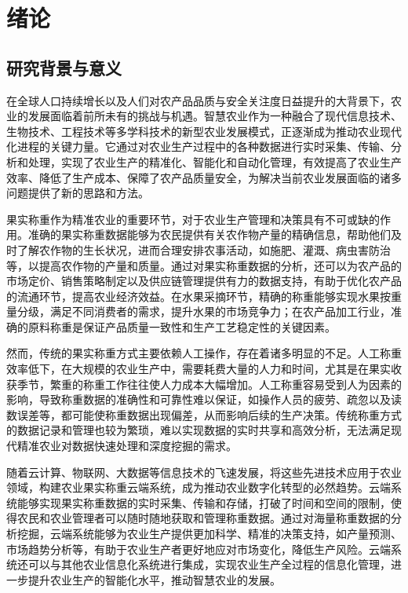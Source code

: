 \documentclass{xduugthesis}
\begin{document}
\chapter{绪论}

\section{研究背景与意义}

在全球人口持续增长以及人们对农产品品质与安全关注度日益提升的大背景下，农业的发展面临着前所未有的挑战与机遇。智慧农业作为一种融合了现代信息技术、生物技术、工程技术等多学科技术的新型农业发展模式\cite{赵春江2021智慧农业的发展现状与未来展望}，正逐渐成为推动农业现代化进程的关键力量。它通过对农业生产过程中的各种数据进行实时采集、传输、分析和处理，实现了农业生产的精准化、智能化和自动化管理\cite{李道亮2012物联网与智慧农业}，有效提高了农业生产效率、降低了生产成本、保障了农产品质量安全，为解决当前农业发展面临的诸多问题提供了新的思路和方法。

果实称重作为精准农业的重要环节，对于农业生产管理和决策具有不可或缺的作用\cite{罗锡文2016信息技术提升农业机械化水平}。准确的果实称重数据能够为农民提供有关农作物产量的精确信息，帮助他们及时了解农作物的生长状况，\cite{翁杨2019基于深度学习的农业植物表型研究综述}进而合理安排农事活动，如施肥、灌溉、病虫害防治等，以提高农作物的产量和质量。通过对果实称重数据的分析，还可以为农产品的市场定价、销售策略制定以及供应链管理提供有力的数据支持，有助于优化农产品的流通环节，提高农业经济效益\cite{Lipcsei2021AnalysisOA}。在水果采摘环节，精确的称重能够实现水果按重量分级，满足不同消费者的需求，提升水果的市场竞争力\cite{Ji2019}；在农产品加工行业，准确的原料称重是保证产品质量一致性和生产工艺稳定性的关键因素。

然而，传统的果实称重方式主要依赖人工操作，存在着诸多明显的不足。人工称重效率低下，在大规模的农业生产中，需要耗费大量的人力和时间，尤其是在果实收获季节，繁重的称重工作往往使人力成本大幅增加\cite{Jiang2012}。人工称重容易受到人为因素的影响，导致称重数据的准确性和可靠性难以保证，如操作人员的疲劳、疏忽以及读数误差等，都可能使称重数据出现偏差，从而影响后续的生产决策\cite{Chen2002}。传统称重方式的数据记录和管理也较为繁琐，难以实现数据的实时共享和高效分析，无法满足现代精准农业对数据快速处理和深度挖掘的需求\cite{Widagdo2020RecordingSO}。

随着云计算、物联网、大数据等信息技术的飞速发展，将这些先进技术应用于农业领域，构建农业果实称重云端系统，成为推动农业数字化转型的必然趋势。云端系统能够实现果实称重数据的实时采集、传输和存储，打破了时间和空间的限制，使得农民和农业管理者可以随时随地获取和管理称重数据\cite{李道亮2012物联网与智慧农业}。通过对海量称重数据的分析挖掘，云端系统能够为农业生产提供更加科学、精准的决策支持，如产量预测、市场趋势分析等，有助于农业生产者更好地应对市场变化，降低生产风险\cite{韩佳伟2022装备与信息协同促进现代智慧农业发展研究}。云端系统还可以与其他农业信息化系统进行集成\cite{刘洋2013基于物联网与云计算服务的农业温室智能化平台研究与应用术}，实现农业生产全过程的信息化管理，进一步提升农业生产的智能化水平，推动智慧农业的发展。
\end{document}
